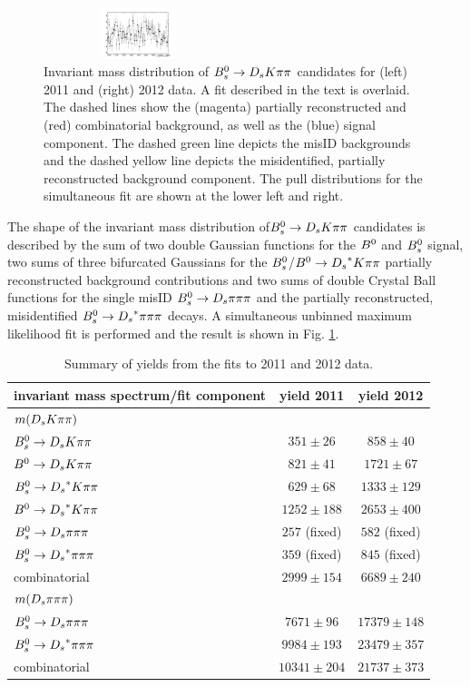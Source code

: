 \begin{figure}[h]
\includegraphics[width=0.49\textwidth,height=1.5cm]{figs/pull_sim12.pdf}
\caption{Invariant mass distribution of ${{B}^0_{s}}\rightarrow{\ensuremath{{D}_{s}}}{\ensuremath{K}}{\ensuremath{\pi}}{\ensuremath{\pi}}$ candidates for (left) 2011 and (right) 2012 data.
A fit described in the text is overlaid. The dashed lines show the (magenta) partially reconstructed and (red) combinatorial background, as well as the (blue) signal component. 
The dashed green line depicts the misID backgrounds and the dashed yellow line depicts the misidentified, partially reconstructed background component. 
The pull distributions for the simultaneous fit are shown at the lower left and right.}
\label{fig: BsDsKpipiFit}
\end{figure}

The shape of the invariant mass distribution of${{B}^0_{s}}\rightarrow{\ensuremath{{D}_{s}}}{\ensuremath{K}}{\ensuremath{\pi}}{\ensuremath{\pi}}$ candidates is described by the sum of two double Gaussian functions for the ${{B}^0}$ and ${{B}^0_{s}}$ signal, 
two sums of three bifurcated Gaussians for the ${{B}^0_{s}}$/${{B}^0}\rightarrow{\ensuremath{{D}_{s}}}^{*}{K}{\pi}{\pi}$ partially reconstructed background contributions and 
two sums of double Crystal Ball functions for the single misID ${{B}^0_{s}}\rightarrow{\ensuremath{{D}_{s}}}{\ensuremath{\pi}}{\ensuremath{\pi}}{\ensuremath{\pi}}$ and the partially reconstructed, misidentified ${{B}^0_{s}}\rightarrow{\ensuremath{{D}_{s}}}^{*}{\pi}{\pi}{\pi}$ decays. 
A simultaneous unbinned maximum likelihood fit is performed and the result is shown in Fig. \ref{fig: BsDsKpipiFit}.
 

\begin{table}[h]
\centering
\begin{tabular}{l c c}
invariant mass spectrum/fit component & yield 2011 & yield 2012\\
\hline \hline
$m({{D}_{s}}{K}{\pi}{\pi})$    &                  &\\
\hline
${{B}^0_{s}}\rightarrow{\ensuremath{{D}_{s}}}{\ensuremath{K}}{\ensuremath{\pi}}{\ensuremath{\pi}}$    &  $351 \pm 26$    &  $858 \pm 40$\\
${{B}^0}\rightarrow{\ensuremath{{D}_{s}}}{\ensuremath{K}}{\ensuremath{\pi}}{\ensuremath{\pi}}$    &  $821 \pm 41$    &  $1721 \pm 67$\\
${{B}^0_{s}}\rightarrow{\ensuremath{{D}_{s}}}^{*}{K}{\pi}{\pi}$ &  $629 \pm 68$   &  $1333 \pm 129$\\
${{B}^0}\rightarrow{\ensuremath{{D}_{s}}}^{*}{K}{\pi}{\pi}$ &  $1252 \pm 188$ &  $2653 \pm 400$\\
${{B}^0_{s}}\rightarrow{\ensuremath{{D}_{s}}}{\ensuremath{\pi}}{\ensuremath{\pi}}{\ensuremath{\pi}}$    &  $257$ (fixed)   & $582$ (fixed)\\
${{B}^0_{s}}\rightarrow{\ensuremath{{D}_{s}}}^{*}{\pi}{\pi}{\pi}$ &  $359$ (fixed)  & $845$ (fixed)\\
combinatorial                 &  $2999 \pm 154$  & $6689 \pm 240$\\
\hline \hline
$m({{D}_{s}}{\pi}{\pi}{\pi})$       &                  &\\
\hline
${{B}^0_{s}}\rightarrow{\ensuremath{{D}_{s}}}{\ensuremath{\pi}}{\ensuremath{\pi}}{\ensuremath{\pi}}$    &  $7671 \pm 96$  &  $17379 \pm 148$\\
${{B}^0_{s}}\rightarrow{\ensuremath{{D}_{s}}}^{*}{\pi}{\pi}{\pi}$ & $9984 \pm 193$  & $23479 \pm 357$\\
combinatorial                 & $10341 \pm 204$  & $21737 \pm 373$\\
\hline
\end{tabular}
\caption{Summary of yields from the fits to 2011 and 2012 data.}
\label{tab: SigYields}
\end{table}

